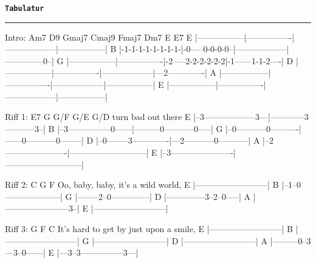 \newpage
\hfill\textbf{\texttt{Tabulatur}}\\[-1em]
\rule{\columnwidth}{1pt}

\begin{lsttab}
Intro:
     Am7     D9      Gmaj7  Cmaj9     Fmaj7  Dm7          E      E7           
E |-----------------|----------------|------------------|-----------------|
B |-1-1-1-1-1-1-1-1-|-0-----0-0-0-0--|------------------|--------------0--|
G |-----------------|----------------|-2-----2-2-2-2-2-2|-1------1-1-2----|
D |-----------------|----------------|------------------|---2-------------|
A |-----------------|----------------|------------------|-----------------|
E |-----------------|----------------|------------------|-----------------|

Riff 1:
      E7        G         G/F               G/E         G/D
turn bad out there
            E |--3------------------3---|------------3-----------3--|
            B |--3---------------0------|---------0-----------0-----|
            G |--0-----------0----------|------0-----------0--------|
            D |--0--------3-------------|---2-----------0-----------|
            A |--2----------------------|---------------------------|
            E |--3----------------------|---------------------------|

Riff 2:
C     G                  F 
Oo, baby, baby, it's a wild world,
                                      E |--------------------------| 
                                      B |--1--0--------------------|
                                      G |--------2--0--------------|
                                      D |--------------3--2--0-----|
                                      A |-----------------------3--|
                                      E |--------------------------|

Riff 3:
G                 F                C 
 It's hard to get by just upon a smile,
                                      E |--------------------------| 
                                      B |--------------------------|
                                      G |--------------------------|
                                      D |--------------------------|
                                      A |---------0--3---3--0------|
                                      E |---3--3---------------3---|
\end{lsttab}
\newpage

\begin{comment}
    ---------------------------------------------------------------
Chords:    Am7       D9        Gmaj7   Cmaj9      Fmaj7    Dm7
          X02013    xx0210    320002   x32030    xx3210   xx0211

           D7         Cmaj7/G     F       Dm       E       E7 
         xx0212       332100   133211   xx0231   022100  022130

            C        G        G/F     G/E       G/D
          032010   320003   xx3003   xx2003    xx0003
\end{comment}

